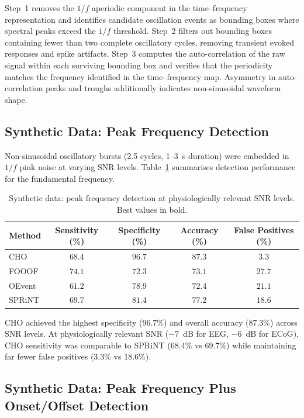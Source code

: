 \documentclass[11pt]{article}
\begin{document}
Step~1 removes the $1/f$ aperiodic component in the time--frequency representation and identifies candidate oscillation events as bounding boxes where spectral peaks exceed the $1/f$ threshold. Step~2 filters out bounding boxes containing fewer than two complete oscillatory cycles, removing transient evoked responses and spike artifacts. Step~3 computes the auto-correlation of the raw signal within each surviving bounding box and verifies that the periodicity matches the frequency identified in the time--frequency map. Asymmetry in auto-correlation peaks and troughs additionally indicates non-sinusoidal waveform shape.

\subsection{Synthetic Data: Peak Frequency Detection}

Non-sinusoidal oscillatory bursts (2.5 cycles, 1--3~s duration) were embedded in $1/f$ pink noise at varying SNR levels. Table~\ref{tab:synth_freq} summarises detection performance for the fundamental frequency.

\begin{table}[H]
\centering
\caption{Synthetic data: peak frequency detection at physiologically relevant SNR levels. Best values in bold.}
\label{tab:synth_freq}
\begin{tabular}{@{}lcccc@{}}
\toprule
Method & Sensitivity (\%) & Specificity (\%) & Accuracy (\%) & False Positives (\%) \\
\midrule
CHO & $68.4$ & $\mathbf{96.7}$ & $\mathbf{87.3}$ & $\mathbf{3.3}$ \\
FOOOF & $74.1$ & $72.3$ & $73.1$ & $27.7$ \\
OEvent & $61.2$ & $78.9$ & $72.4$ & $21.1$ \\
SPRiNT & $69.7$ & $81.4$ & $77.2$ & $18.6$ \\
\bottomrule
\end{tabular}
\end{table}

CHO achieved the highest specificity (96.7\%) and overall accuracy (87.3\%) across SNR levels. At physiologically relevant SNR ($-7$~dB for EEG, $-6$~dB for ECoG), CHO sensitivity was comparable to SPRiNT (68.4\% vs 69.7\%) while maintaining far fewer false positives (3.3\% vs 18.6\%).

\subsection{Synthetic Data: Peak Frequency Plus Onset/Offset Detection}
\end{document}
